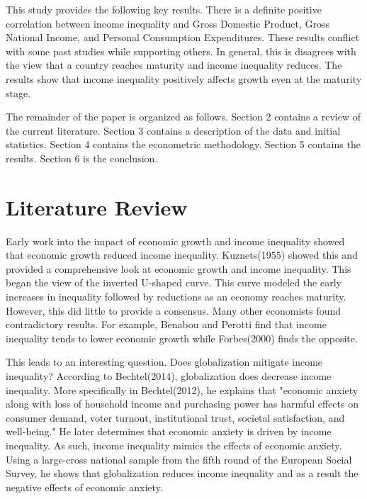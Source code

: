 \documentclass{article}
\begin{document}
\quad This study provides the following key results.  There is a definite positive correlation between income inequality and Gross Domestic Product, Gross National Income, and Personal Consumption Expenditures.    These results conflict with some past studies while supporting others.  In general, this is disagrees with the view that a country reaches maturity and income inequality reduces.  The results show that income inequality positively affects growth even at the maturity stage. 
\vspace{2mm}

\quad The remainder of the paper is organized as follows.  Section 2 contains a review of the current literature. Section 3 contains a description of the data and initial statistics.  Section 4 contains the econometric methodology.  Section 5 contains the results.  Section 6 is the conclusion.  

\section{Literature Review}
\vspace{2mm}

\quad Early work into the impact of economic growth and income inequality showed that economic growth reduced income inequality.  Kuznets(1955) showed this and provided a comprehensive look at economic growth and income inequality.  This began the view of the inverted U-shaped curve.  This curve modeled the early increases in inequality followed by reductions as an economy reaches maturity.  However, this did little to provide a consensus.  Many other economists found contradictory results.  For example, Benabou and Perotti find that income inequality tends to lower economic growth while Forbes(2000) finds the opposite.
\vspace{2mm}

\quad This leads to an interesting question.  Does globalization mitigate income inequality?  According to Bechtel(2014), globalization does decrease income inequality.  More specifically in Bechtel(2012), he explains that "economic anxiety along with loss of household income and purchasing power has harmful effects on consumer demand, voter turnout, institutional trust, societal satisfaction, and well-being."  He later determines that economic anxiety is driven by income inequality.  As such, income inequality mimics the effects of economic anxiety.  Using a large-cross national sample from the fifth round of the European Social Survey, he shows that globalization reduces income inequality and as a result the negative effects of economic anxiety.
\vspace{2mm}
\end{document}
